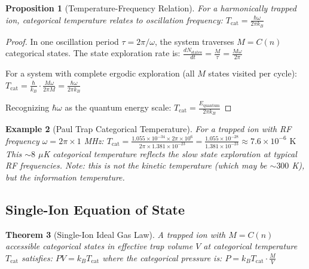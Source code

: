 \documentclass[twocolumn,10pt]{article}
\newtheorem{theorem}{Theorem}[section]
\newtheorem{proposition}[theorem]{Proposition}
\newtheorem{example}[theorem]{Example}
\begin{document}
\begin{proposition}[Temperature-Frequency Relation]
\label{prop:tempfreq}
For a harmonically trapped ion, categorical temperature relates to oscillation frequency:
$
T_{\mathrm{cat}} = \frac{\hbar \omega}{2\pi k_B}
$
\end{proposition}

\begin{proof}
In one oscillation period $\tau = 2\pi/\omega$, the system traverses $M = C(n)$ categorical states. The state exploration rate is:
$
\frac{dN_{\mathrm{states}}}{dt} = \frac{M}{\tau} = \frac{M\omega}{2\pi}
$

For a system with complete ergodic exploration (all $M$ states visited per cycle):
$
T_{\mathrm{cat}} = \frac{\hbar}{k_B} \cdot \frac{M\omega}{2\pi M} = \frac{\hbar\omega}{2\pi k_B}
$

Recognizing $\hbar\omega$ as the quantum energy scale:
$
T_{\mathrm{cat}} = \frac{E_{\mathrm{quantum}}}{2\pi k_B}
$
\end{proof}

\begin{example}[Paul Trap Categorical Temperature]
\label{ex:paul_temp}
For a trapped ion with RF frequency $\omega = 2\pi \times 1$ MHz:
$
T_{\mathrm{cat}} = \frac{1.055 \times 10^{-34} \times 2\pi \times 10^6}{2\pi \times 1.381 \times 10^{-23}} = \frac{1.055 \times 10^{-28}}{1.381 \times 10^{-23}} \approx 7.6 \times 10^{-6} \text{ K}
$
This $\sim 8$ $\mu$K categorical temperature reflects the slow state exploration at typical RF frequencies. Note: this is \emph{not} the kinetic temperature (which may be $\sim 300$ K), but the \emph{information temperature}.
\end{example}

\subsection{Single-Ion Equation of State}

\begin{theorem}[Single-Ion Ideal Gas Law]
\label{thm:ideal}
A trapped ion with $M = C(n)$ accessible categorical states in effective trap volume $V$ at categorical temperature $T_{\mathrm{cat}}$ satisfies:
$
PV = k_B T_{\mathrm{cat}}
$
where the categorical pressure is:
$
P = k_B T_{\mathrm{cat}} \cdot \frac{M}{V}
$
\end{theorem}
\end{document}
